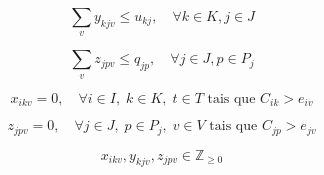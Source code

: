 \begin{equation*}
\sum_{v} y_{kjv} \le u_{kj}, \quad \forall k \in K, j \in J
\end{equation*}

\begin{equation*}
\sum_{v} z_{jpv} \le q_{jp}, \quad \forall j \in J, p \in P_j
\end{equation*}

\begin{equation*}
    x_{ikv} = 0, \quad \forall i \in I, \; k \in K, \; t \in T \text{ tais que } C_{ik} > e_{iv}
\end{equation*}

\begin{equation*}
    z_{jpv} = 0, \quad \forall j \in J, \; p \in P_j, \; v \in V \text{ tais que } C_{jp} > e_{jv}
\end{equation*}

\begin{equation*}
x_{ikv}, y_{kjv}, z_{jpv} \in \mathbb{Z}_{\geq 0}
\end{equation*}

\bigskip